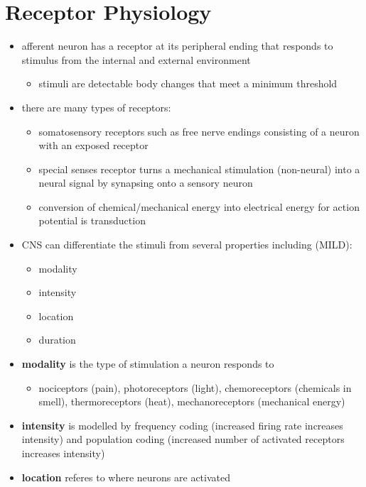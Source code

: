 \documentclass[10pt]{article}
\begin{document}
\section{Receptor Physiology}
\begin{itemize}
    \item afferent neuron has a receptor at its peripheral ending that responds to stimulus from the internal and external environment
        \begin{itemize}
            \item stimuli are detectable body changes that meet a minimum threshold
        \end{itemize}
    \item there are many types of receptors:
        \begin{itemize}
            \item somatosensory receptors such as free nerve endings consisting of a neuron with an exposed receptor
            \item special senses receptor turns a mechanical stimulation (non-neural) into a neural signal by synapsing onto a sensory neuron
            \item conversion of chemical/mechanical energy into electrical energy for action potential is transduction
        \end{itemize}
    \item CNS can differentiate the stimuli from several properties including (MILD):
        \begin{itemize}
            \item modality
            \item intensity 
            \item location 
            \item duration
        \end{itemize}
    \item \textbf{modality} is the type of stimulation a neuron responds to
        \begin{itemize}
            \item nociceptors (pain), photoreceptors (light), chemoreceptors (chemicals in smell), thermoreceptors (heat), mechanoreceptors (mechanical energy)
        \end{itemize}
    \item \textbf{intensity} is modelled by frequency coding (increased firing rate increases intensity) and population coding (increased number of activated receptors increases intensity)
    \item \textbf{location} referes to where neurons are activated

\end{itemize}
\end{document}
